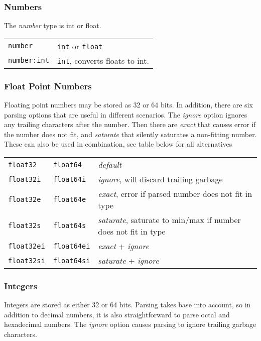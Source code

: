 \subsubsection{Numbers}
The \emph{number} type is int or float.\\

\begin{tabular}{ll}
  \texttt{number}     & \texttt{int} or \texttt{float}\\
  \texttt{number:int} & \texttt{int}, converts floats to int.\\
\end{tabular}



\subsubsection{Float Point Numbers}
Floating point numbers may be stored as 32 or 64 bits.  In addition,
there are six parsing options that are useful in different scenarios.
The \emph{ignore} option ignores any trailing characters after the
number.  Then there are \emph{exact} that causes error if the number
does not fit, and \emph{saturate} that silently saturates a
non-fitting number.  These can also be used in combination, see table
below for all alternatives\\

\begin{tabular}{lll}
\texttt{float32} & \texttt{float64} & \emph{default}\\
\texttt{float32i} & \texttt{float64i} & \emph{ignore}, will discard trailing garbage\\
\texttt{float32e} & \texttt{float64e} & \emph{exact}, error if parsed number does not fit in type \\
\texttt{float32s} & \texttt{float64s} & \emph{saturate}, saturate to min/max if number does not fit in type \\
\texttt{float32ei} & \texttt{float64ei} & \emph{exact} + \emph{ignore} \\
\texttt{float32si} & \texttt{float64si} & \emph{saturate} + \emph{ignore} \\
\end{tabular}

\subsubsection{Integers}
Integers are stored as either 32 or 64 bits.  Parsing takes base into
account, so in addition to decimal numbers, it is also straightforward
to parse octal and hexadecimal numbers.  The \emph{ignore} option
causes parsing to ignore trailing garbage characters.\\

